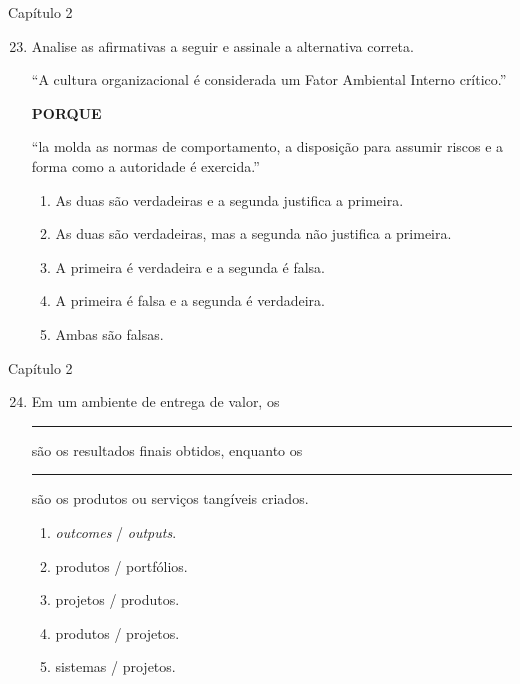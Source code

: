 \documentclass{beamer}
\begin{document}
\begin{frame}{Capítulo 2}
	\begin{enumerate}
		\setcounter{enumi}{22}
		\justifying
		\item Analise as afirmativas a seguir e assinale a alternativa correta.
		
		\vspace{10pt}
		``A cultura organizacional é considerada um Fator Ambiental Interno crítico.''
		
		\vspace{10pt}
		\centering \textbf{PORQUE}
		
		\vspace{10pt}
		\justifying
		``la molda as normas de comportamento, a disposição para assumir riscos e a forma como a autoridade é exercida.''
		
		\vspace{10pt}
		\begin{enumerate}[a]
			\item \alert<2>{As duas são verdadeiras e a segunda justifica a primeira}.
			\item As duas são verdadeiras, mas a segunda não justifica a primeira.
			\item A primeira é verdadeira e a segunda é falsa.
			\item A primeira é falsa e a segunda é verdadeira.
			\item Ambas são falsas.
		\end{enumerate}
	\end{enumerate}
\end{frame}

\begin{frame}{Capítulo 2}
	\begin{enumerate}
		\setcounter{enumi}{23}
		\justifying
		\item Em um ambiente de entrega de valor, os \rule{50pt}{1pt} são os resultados finais obtidos, enquanto os \rule{50pt}{1pt} são os produtos ou serviços tangíveis criados.
		\begin{enumerate}[a]
			\item \alert<2>{\textit{outcomes} / \textit{outputs}}.
			\item produtos / portfólios.
			\item projetos / produtos.
			\item produtos / projetos.
			\item sistemas / projetos.
		\end{enumerate}
	\end{enumerate}
\end{frame}
\end{document}
